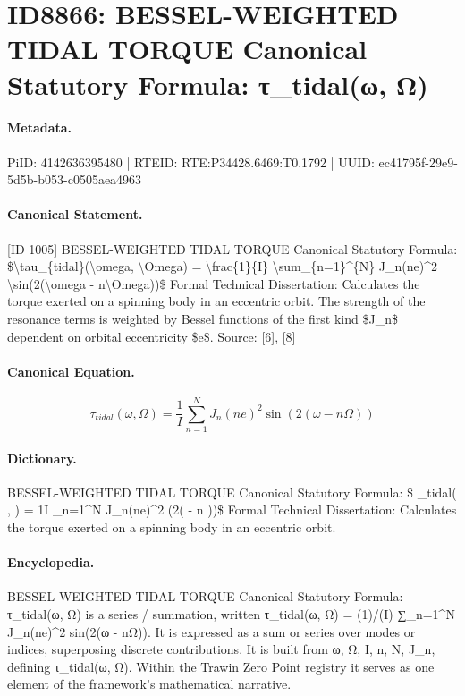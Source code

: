 \section*{ID8866: BESSEL-WEIGHTED TIDAL TORQUE Canonical Statutory Formula: τ\_tidal(ω, Ω)}
\paragraph{Metadata.}
PiID: 4142636395480 | RTEID: RTE:P34428.6469:T0.1792 | UUID: ec41795f-29e9-5d5b-b053-c0505aea4963

\paragraph{Canonical Statement.}
[ID 1005] BESSEL-WEIGHTED TIDAL TORQUE Canonical Statutory Formula: \$\textbackslash{}tau\_\{tidal\}(\textbackslash{}omega, \textbackslash{}Omega) = \textbackslash{}frac\{1\}\{I\} \textbackslash{}sum\_\{n=1\}\textasciicircum{}\{N\} J\_n(ne)\textasciicircum{}2 \textbackslash{}sin(2(\textbackslash{}omega - n\textbackslash{}Omega))\$ Formal Technical Dissertation: Calculates the torque exerted on a spinning body in an eccentric orbit. The strength of the resonance terms is weighted by Bessel functions of the first kind \$J\_n\$ dependent on orbital eccentricity \$e\$. Source: [6], [8]

\paragraph{Canonical Equation.}
\[
\tau_{tidal}(\omega, \Omega) = \frac{1}{I} \sum_{n=1}^{N} J_n(ne)^2 \sin(2(\omega - n\Omega))
\]

\paragraph{Dictionary.}
BESSEL-WEIGHTED TIDAL TORQUE Canonical Statutory Formula: \$ \_tidal( , ) = 1I \_n=1\textasciicircum{}N J\_n(ne)\textasciicircum{}2 (2( - n ))\$ Formal Technical Dissertation: Calculates the torque exerted on a spinning body in an eccentric orbit.

\paragraph{Encyclopedia.}
BESSEL-WEIGHTED TIDAL TORQUE Canonical Statutory Formula: τ\_tidal(ω, Ω) is a series / summation, written τ\_tidal(ω, Ω) = (1)/(I) ∑\_n=1\textasciicircum{}N J\_n(ne)\textasciicircum{}2 sin(2(ω - nΩ)). It is expressed as a sum or series over modes or indices, superposing discrete contributions. It is built from ω, Ω, I, n, N, J\_n, defining τ\_tidal(ω, Ω). Within the Trawin Zero Point registry it serves as one element of the framework's mathematical narrative.
